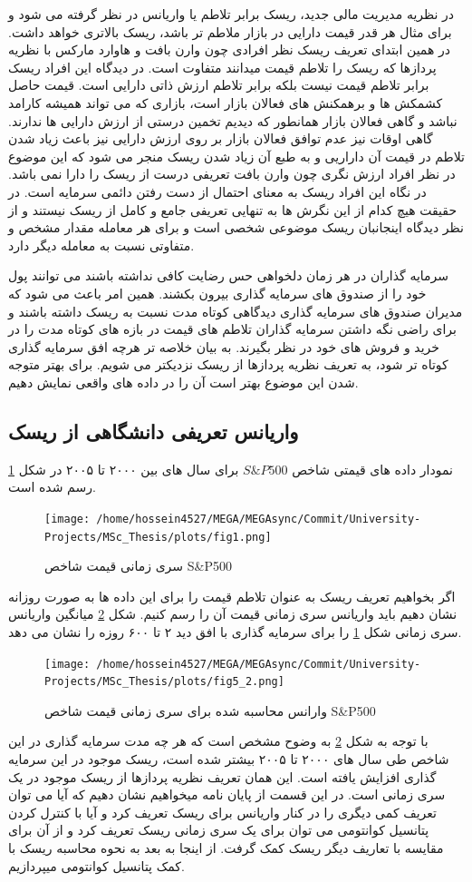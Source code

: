 \documentclass[a4paper,titlepage,12pt,fleqn,oneside]{report}
\begin{document}
	در نظریه مدیریت مالی جدید، ریسک برابر تلاطم یا واریانس در نظر گرفته می شود و برای مثال هر قدر قیمت دارایی در بازار ملاطم تر باشد، ریسک بالاتری خواهد داشت. در همین ابتدای تعریف ریسک نظر افرادی چون وارن بافت و هاوارد مارکس با نظریه پردازها که ریسک را تلاطم قیمت میدانند متفاوت است. در دیدگاه این افراد ریسک برابر تلاطم قیمت نیست بلکه برابر تلاطم ارزش ذاتی دارایی است. قیمت حاصل کشمکش ها و برهمکنش های فعالان بازار است، بازاری که می تواند همیشه کارامد نباشد و گاهی فعالان بازار همانطور که دیدیم تخمین درستی از ارزش دارایی ها ندارند. گاهی اوقات نیز عدم توافق فعالان بازار بر روی ارزش دارایی نیز باعث زیاد شدن تلاطم در قیمت آن داراریی و به طبع آن زیاد شدن ریسک منجر می شود که این موضوع در نظر افراد ارزش نگری چون وارن بافت تعریفی درست از ریسک را دارا نمی باشد. در نگاه این افراد ریسک به معنای احتمال از دست رفتن دائمی سرمایه است. در حقیقت هیچ کدام از این نگرش ها به تنهایی تعریفی جامع و کامل از ریسک نیستند و از نظر دیدگاه اینجانبان ریسک موضوعی شخصی است و برای هر معامله مقدار مشخص و متفاوتی نسبت به معامله دیگر دارد.
	
	سرمایه گذاران در هر زمان دلخواهی حس رضایت کافی نداشته باشند می توانند پول خود را از صندوق های سرمایه گذاری بیرون بکشند. همین امر باعث می شود که مدیران صندوق های سرمایه گذاری دیدگاهی کوتاه مدت نسبت به ریسک داشته باشند و برای راضی نگه داشتن سرمایه گذاران  تلاطم های قیمت در بازه های کوتاه مدت را در خرید و فروش های خود در نظر بگیرند.  به بیان خلاصه تر هرچه افق سرمایه گذاری کوتاه تر شود، به تعریف نظریه پردازها از ریسک نزدیکتر می شویم. برای بهتر متوجه شدن این موضوع بهتر است آن را در داده های واقعی نمایش دهیم.
	
	\subsection{واریانس تعریفی دانشگاهی از ریسک}
	نمودار داده های قیمتی شاخص
	$S\&P500$
	برای سال های بین ۲۰۰۰ تا ۲۰۰۵ در شکل 
	\ref{fig:5.1}
	رسم شده است.
	\begin{figure}[ptb]
		\centering
		\texttt{[image: /home/hossein4527/MEGA/MEGAsync/Commit/University-Projects/MSc\_Thesis/plots/fig1.png]}
		\caption{سری زمانی قیمت شاخص S\&P500}
		\label{fig:5.1}
	\end{figure}
	اگر بخواهیم تعریف ریسک به عنوان تلاطم قیمت را برای این داده ها به صورت روزانه نشان دهیم باید واریانس سری زمانی قیمت آن را رسم کنیم. شکل
	\ref{fig:5.2}
	میانگین واریانس سری زمانی شکل 
	\ref{fig:5.1}
	را برای سرمایه گذاری با افق دید ۲ تا ۶۰۰ روزه را نشان می دهد. 
	\begin{figure}[ptb]
		\centering
		\texttt{[image: /home/hossein4527/MEGA/MEGAsync/Commit/University-Projects/MSc\_Thesis/plots/fig5\_2.png]}
		\caption{وارانس محاسبه شده برای سری زمانی قیمت شاخص S\&P500}
		\label{fig:5.2}
	\end{figure}
	با توجه به شکل
	\ref{fig:5.2}
	به وضوح مشخص است که هر چه مدت  سرمایه گذاری در این شاخص طی سال های ۲۰۰۰ تا ۲۰۰۵ بیشتر شده است، ریسک موجود در این سرمایه گذاری افزایش یافته است.  این همان تعریف نظریه پردازها از ریسک موجود در یک سری زمانی است. در این قسمت از پایان  نامه میخواهیم نشان دهیم  که آیا می توان تعریف کمی دیگری را در کنار واریانس برای ریسک تعریف کرد و آیا با کنترل کردن پتانسیل کوانتومی می توان برای یک سری زمانی ریسک تعریف کرد و از آن برای مقایسه با تعاریف دیگر ریسک کمک گرفت. از اینجا به بعد به نحوه محاسبه ریسک با کمک پتانسیل کوانتومی میپردازیم.
\end{document}
